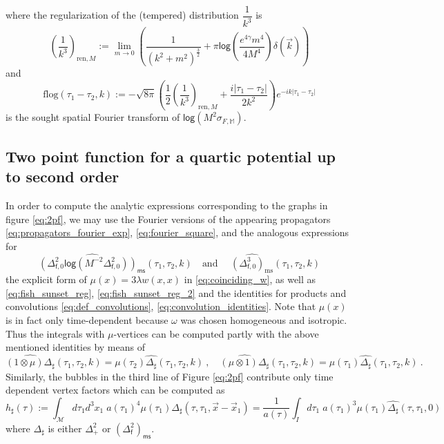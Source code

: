 \documentclass[11pt]{book}
\newcommand{\ms}{\mathsf{ms}}
\renewcommand{\log}{\mathsf{log}}
\newcommand{\Mcal}{\mathcal{M}}
\newcommand{\Mbb}{\mathbb{M}}
\newcommand{\fsf}{\mathsf{f}}
\theoremstyle{break}
\begin{document}
%
where the regularization of the (tempered) distribution $\dfrac{1}{k^3}$ is 
%
\begin{equation}
\left(\frac{1}{k^3}\right)_{\text{ren},M}:=\lim_{m\to 0}\left(\frac{1}{(k^2+m^2)^{\frac32}}+\pi\log\left(\frac{e^{4\gamma}m^4}{4 M^4}\right)\delta(\vec{k})\right)
\label{eq:regk3}
\end{equation}
and
\begin{equation}
\text{flog}(\tau_1-\tau_2,k):=-\sqrt{8\pi}\left(\frac{1}{2}\left(\frac{1}{k^3}\right)_{\text{ren},M}+\frac{i|\tau_1-\tau_2|}{2k^2}\right)e^{-ik|\tau_1-\tau_2|}
\label{eq:flog}
\end{equation}
%
is the sought spatial Fourier transform of $\log \left(M^2 \sigma_{F,\Mbb}\right)$. 

\subsection{Two point function for a quartic potential up to second order}


In order to compute the analytic expressions corresponding to the graphs in figure \eqref{eq:2pf}, we may use the Fourier versions of the appearing propagators \eqref{eq:propagators_fourier_exp}, \eqref{eq:fourier_square}, and the analogous expressions for 
%
\begin{equation*}
\widehat{\left(\Delta^2_{\fsf,0}\log\left(M^{-2}\Delta^2_{\fsf,0}\right) \right)_\ms}(\tau_1,\tau_2,k) \quad \mbox{and } \quad \widehat{\left(\Delta^3_{\fsf,0}\right)_\text{ms}}(\tau_1,\tau_2,k)
\end{equation*}
%
the explicit form of $\mu(x)=3\lambda w(x,x)$ in \eqref{eq:coinciding_w}, as well as \eqref{eq:fish_sunset_reg}, \eqref{eq:fish_sunset_reg_2} and the identities for products and convolutions \eqref{eq:def_convolutions}, \eqref{eq:convolution_identities}. Note that $\mu(x)$ is in fact only time-dependent because $\omega$ was chosen homogeneous and isotropic. Thus the integrals with $\mu$-vertices can be computed partly with the above mentioned identities by means of 
%
\begin{equation*}
\widehat{(1\otimes \mu) \Delta_{\sharp}}(\tau_1,\tau_2,k)=\mu(\tau_2)\widehat{\Delta_{\sharp}}(\tau_1,\tau_2,k) \ , \quad\widehat{(\mu\otimes 1) \Delta_{\sharp}}(\tau_1,\tau_2,k)=\mu(\tau_1)\widehat{\Delta_{\sharp}}(\tau_1,\tau_2,k) \ . 
\end{equation*}
%
Similarly, the bubbles in the third line of Figure \eqref{eq:2pf} contribute only time dependent vertex factors which can be computed as 
%
\begin{equation*}
h_\sharp(\tau):=\int_\Mcal d\tau_1 d^3x_1\; a(\tau_1)^4\mu(\tau_1)\Delta_\sharp(\tau,\tau_1,\vec{x}-\vec{x}_1)=\frac{1}{a(\tau)}\int_I d\tau_1\;a(\tau_1)^3 \mu(\tau_1)\widehat{\Delta_\sharp}(\tau,\tau_1,0) 
\end{equation*}
%
where $\Delta_\sharp$ is either $\Delta^2_+$ or $\left(\Delta^2_\fsf\right)_\ms$.
\end{document}
